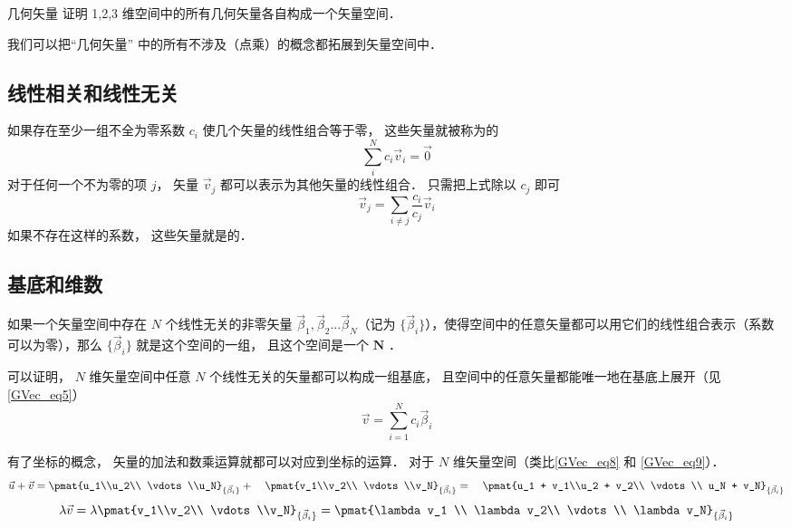 \begin{exer}{几何矢量}
证明 1,2,3 维空间中的所有几何矢量各自构成一个矢量空间．
\end{exer}

我们可以把“几何矢量” 中的所有不涉及（点乘）的概念都拓展到矢量空间中．

\subsection{线性相关和线性无关}
如果存在至少一组不全为零系数 $c_i$ 使几个矢量的线性组合等于零， 这些矢量就被称为的
\begin{equation}
\sum_i^N c_i \vec v_i = \vec 0
\end{equation}
对于任何一个不为零的项 $j$， 矢量 $\vec v_j$ 都可以表示为其他矢量的线性组合． 只需把上式除以 $c_j$ 即可
\begin{equation}
\vec v_j = \sum_{i \ne j}\frac{c_i}{c_j} \vec v_i
\end{equation}
如果不存在这样的系数， 这些矢量就是的． 

\subsection{基底和维数}
如果一个矢量空间中存在 $N$ 个线性无关的非零矢量 $\vec \beta_1, \vec \beta_2 \dots \vec \beta_N$（记为 $\{\vec \beta_i\}$），使得空间中的任意矢量都可以用它们的线性组合表示（系数可以为零），那么 $\{\vec \beta_i\}$ 就是这个空间的一组， 且这个空间是一个 $\boldsymbol{N}$ ．

可以证明， $N$ 维矢量空间中任意 $N$ 个线性无关的矢量都可以构成一组基底， 且空间中的任意矢量都能唯一地在基底上展开（见\autoref{GVec_eq5}）
\begin{equation}
\vec v = \sum_{i=1}^N c_i \vec \beta_i
\end{equation}

有了坐标的概念， 矢量的加法和数乘运算就都可以对应到坐标的运算． 对于 $N$ 维矢量空间（类比\autoref{GVec_eq8} 和 \autoref{GVec_eq9}）．
\begin{equation}
\vec u + \vec v = \pmat{u_1\\u_2\\ \vdots\\u_N}_{\{\vec\beta_i\}} + \quad \pmat{v_1\\v_2\\ \vdots \\v_N}_{\{\vec\beta_i\}} = \quad \pmat{u_1 + v_1\\u_2 + v_2\\ \vdots \\ u_N + v_N}_{\{\vec\beta_i\}}
\end{equation}
\begin{equation}
\lambda \vec v = \lambda\pmat{v_1\\v_2\\ \vdots \\v_N}_{\{\vec\beta_i\}} = \pmat{\lambda v_1 \\ \lambda v_2\\ \vdots \\ \lambda v_N}_{\{\vec\beta_i\}}
\end{equation}

